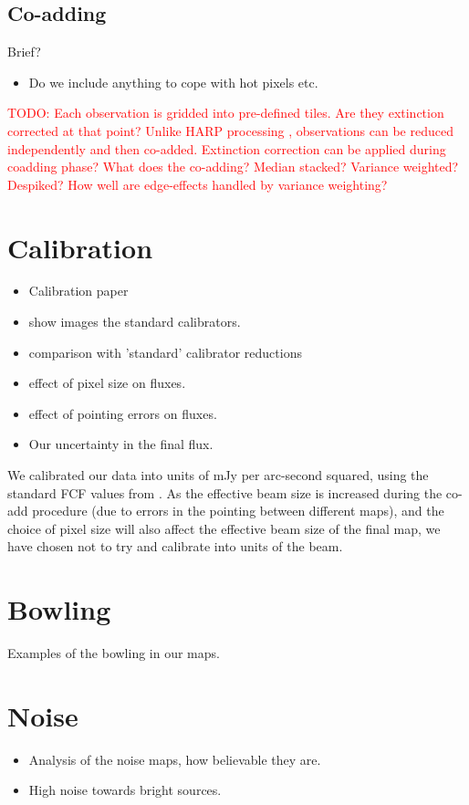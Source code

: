 \documentclass[usenatbib]{mn2e}
\newcommand{\todo}[1]{\textcolor{red}{TODO: #1}}
\begin{document}
\subsection{Co-adding}
Brief?
\begin{itemize}
\item Do we include anything to cope with hot pixels etc.
\end{itemize}

\todo{Each observation is gridded into pre-defined tiles. Are they
  extinction corrected at that point? Unlike HARP processing
  \citep{2015ACSISDR}, observations can be reduced independently and
  then co-added. Extinction correction can be applied during coadding
  phase? What does the co-adding? Median stacked? Variance weighted?
  Despiked? How well are edge-effects handled by variance weighting?}


\section{Calibration}
\begin{itemize}
\item Calibration paper \citep{2013MNRAS.430.2534D}
\item show images the standard calibrators.
\item comparison with 'standard' calibrator reductions
\item effect of pixel size on fluxes.
\item effect of pointing errors on fluxes.
\item Our uncertainty in the final flux.
\end{itemize}


We calibrated our data into units of mJy per arc-second squared, using
the standard FCF values from \citet{2013MNRAS.430.2534D}.  As the
effective beam size is increased during the co-add procedure (due to
errors in the pointing between different maps), and the choice of
pixel size will also affect the effective beam size of the final map,
we have chosen not to try and calibrate into units of the beam.


\section{Bowling}
Examples of the bowling in our maps.

\section{Noise}
\begin{itemize}
\item Analysis of the noise maps, how believable they are.
\item High noise towards bright sources.
\end{itemize}
\end{document}

